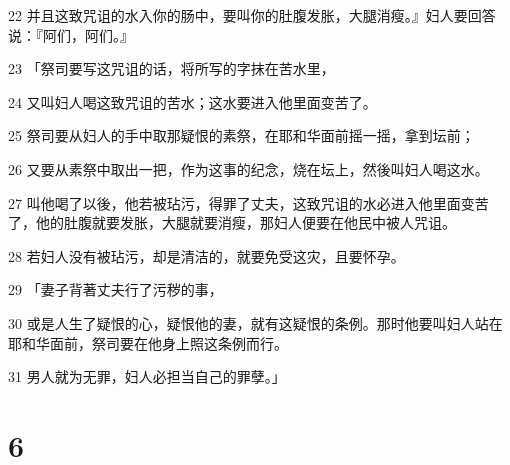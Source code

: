\par 22 并且这致咒诅的水入你的肠中，要叫你的肚腹发胀，大腿消瘦。』妇人要回答说：『阿们，阿们。』
\par 23 「祭司要写这咒诅的话，将所写的字抹在苦水里，
\par 24 又叫妇人喝这致咒诅的苦水；这水要进入他里面变苦了。
\par 25 祭司要从妇人的手中取那疑恨的素祭，在耶和华面前摇一摇，拿到坛前；
\par 26 又要从素祭中取出一把，作为这事的纪念，烧在坛上，然後叫妇人喝这水。
\par 27 叫他喝了以後，他若被玷污，得罪了丈夫，这致咒诅的水必进入他里面变苦了，他的肚腹就要发胀，大腿就要消瘦，那妇人便要在他民中被人咒诅。
\par 28 若妇人没有被玷污，却是清洁的，就要免受这灾，且要怀孕。
\par 29 「妻子背著丈夫行了污秽的事，
\par 30 或是人生了疑恨的心，疑恨他的妻，就有这疑恨的条例。那时他要叫妇人站在耶和华面前，祭司要在他身上照这条例而行。
\par 31 男人就为无罪，妇人必担当自己的罪孽。」

\chapter{6}

